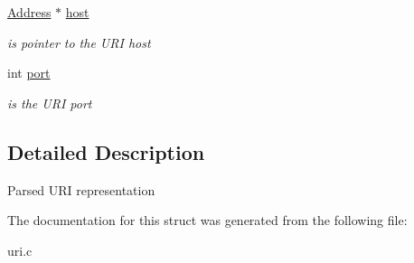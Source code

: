 \begin{DoxyCompactItemize}
\mbox{\label{structUri_a8c55d8f97378d3d64fe6d578fa5eb172}} 
\hyperlink{group__address_ga80f2dcdb3778441e85ac8c9dbb6f324a}{Address} $\ast$ \hyperlink{structUri_a8c55d8f97378d3d64fe6d578fa5eb172}{host}
\begin{DoxyCompactList}\small\item\em is pointer to the U\+RI host \end{DoxyCompactList}\item 
\mbox{\label{structUri_a922a13fcbbba10e21391aadbf484e05c}} 
int \hyperlink{structUri_a922a13fcbbba10e21391aadbf484e05c}{port}
\begin{DoxyCompactList}\small\item\em is the U\+RI port \end{DoxyCompactList}\end{DoxyCompactItemize}


\subsection{Detailed Description}
Parsed U\+RI representation 

The documentation for this struct was generated from the following file\+:\begin{DoxyCompactItemize}
\item 
uri.\+c\end{DoxyCompactItemize}
